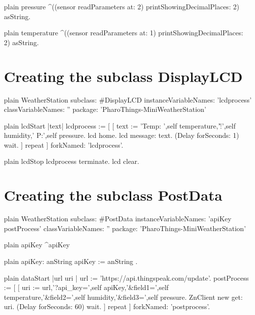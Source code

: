 \documentclass[10pt,twoside,english]{_support/latex/sbabook/sbabook}
\begin{document}
\begin{displaycode}{plain}
pressure
    ^((sensor readParameters at: 2) printShowingDecimalPlaces: 2) asString. 
\end{displaycode}

\begin{displaycode}{plain}
temperature 
    ^((sensor readParameters at: 1) printShowingDecimalPlaces: 2) asString.
\end{displaycode}
\section{Creating the subclass DisplayLCD}
\begin{displaycode}{plain}
WeatherStation subclass: #DisplayLCD
    instanceVariableNames: 'lcdprocess'
    classVariableNames: ''
    package: 'PharoThings-MiniWeatherStation'
\end{displaycode}

\begin{displaycode}{plain}
lcdStart
    |text|
    lcdprocess :=  [ [        
    text := 'Temp: ',self temperature,'\H:',self humidity,' P:',self pressure. 
    lcd home. 
    lcd message: text. 
    (Delay forSeconds: 1) wait. 
    ] repeat ] forkNamed: 'lcdprocess'. 
\end{displaycode}

\begin{displaycode}{plain}
lcdStop
    lcdprocess terminate. 
    lcd clear.
\end{displaycode}
\section{Creating the subclass PostData}
\begin{displaycode}{plain}
WeatherStation subclass: #PostData
	instanceVariableNames: 'apiKey postProcess'
	classVariableNames: ''
	package: 'PharoThings-MiniWeatherStation'
\end{displaycode}

\begin{displaycode}{plain}
apiKey
    ^apiKey
\end{displaycode}

\begin{displaycode}{plain}
apiKey: anString    
    apiKey := anString .
\end{displaycode}

\begin{displaycode}{plain}
dataStart
    |url uri |
    url := 'https://api.thingspeak.com/update'.
    postProcess :=  [ [        
        uri := url,'?api_key=',self apiKey,'&field1=',self temperature,'&field2=',self humidity,'&field3=',self pressure.
        ZnClient new get: uri.
    (Delay forSeconds: 60) wait. 
    ] repeat ] forkNamed: 'postprocess'. 
\end{displaycode}
\end{document}
